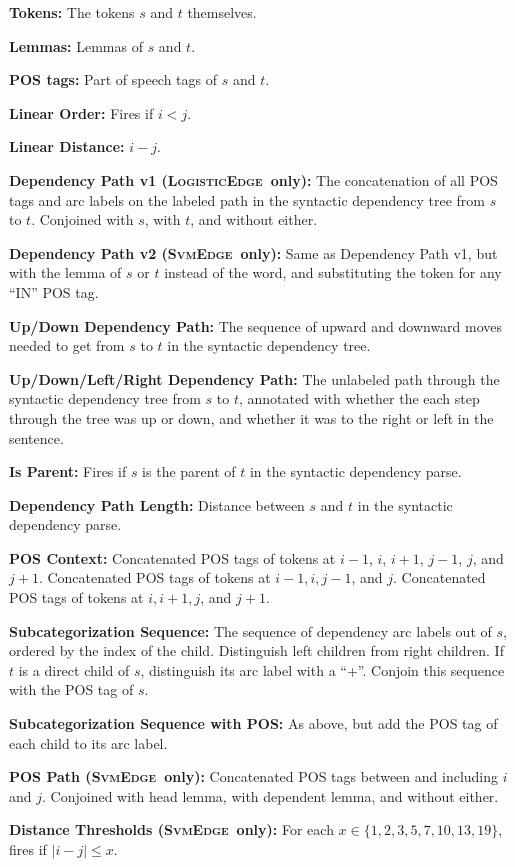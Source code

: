 \documentclass[11pt]{article}
\newcommand{\logitedge}{\textsc{LogisticEdge}}
\newcommand{\svmedge}{\textsc{SvmEdge}}
\begin{document}
\renewcommand{\floatpagefraction}{0.8}
\begin{table}
\begin{framed}
\begin{small}

\textbf{Tokens:} The tokens $s$ and $t$ themselves.

\textbf{Lemmas:} Lemmas of $s$ and $t$.

\textbf{POS tags:} Part of speech tags of $s$ and $t$.

\textbf{Linear Order:} Fires if $i < j$.

\textbf{Linear Distance:} $i - j$.

\textbf{Dependency Path v1 (\logitedge~only):} The concatenation of all POS
tags and arc labels on the labeled path in the syntactic dependency tree from $s$ to
$t$.  Conjoined with $s$, with $t$, and without either.

\textbf{Dependency Path v2 (\svmedge~only):}
Same as Dependency Path v1, but with the lemma of $s$ or $t$ instead of the
word, and substituting the token for any ``IN'' POS tag.

\textbf{Up/Down Dependency Path:} The sequence of upward and
	downward moves needed to get from $s$ to $t$ in the syntactic dependency
	tree.

\textbf{Up/Down/Left/Right Dependency Path:} The unlabeled path through
	the syntactic dependency tree from $s$ to $t$, annotated with whether the each
	step through the tree was up or down, and whether it was to the right or left
	in the sentence.

\textbf{Is Parent:} Fires if  $s$ is the parent of $t$ in the syntactic
	dependency parse.

\textbf{Dependency Path Length:} Distance between $s$ and $t$ in the
	syntactic dependency parse.

\textbf{POS Context:} Concatenated POS tags of tokens at $i-1$, $i$,
	$i+1$, $j-1$, $j$, and $j+1$. Concatenated POS tags of tokens at $i-1, i, j-1$,
	and $j$. Concatenated POS tags of tokens at $i, i+1, j$, and $j+1$.

\textbf{Subcategorization Sequence:} 
	The sequence of dependency arc labels out of $s$, ordered by the index of the
	child.
	Distinguish left children from right children.
	If $t$ is a direct child of $s$, distinguish its arc label with a ``+''.
	Conjoin this sequence with the POS tag of $s$.

\textbf{Subcategorization Sequence with POS:} As above, but add the
	POS tag of each child to its arc label.

\textbf{POS Path (\svmedge~only):}
Concatenated POS tags between and including $i$ and $j$.
Conjoined with head lemma, with dependent lemma, and without either.


\textbf{Distance Thresholds (\svmedge~only):}
For each $x \in \{1, 2, 3, 5, 7, 10, 13, 19\}$, fires if $|i-j| \le x$.


\end{small}
\end{framed}
\caption{Features used in edge prediction}
\label{table:edgefeatures}
\end{table}
\end{document}
